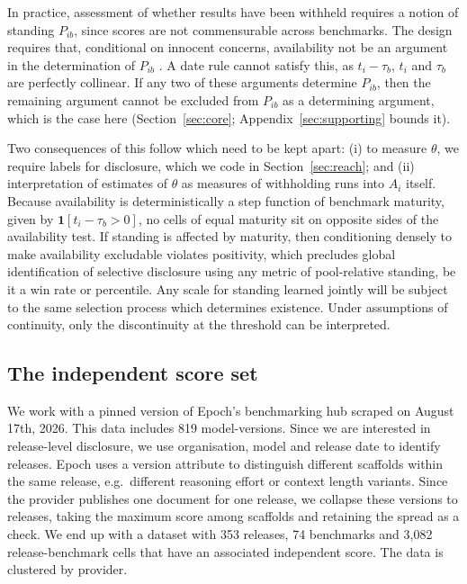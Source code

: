 \documentclass{article}
\begin{document}
In practice, assessment of whether results have been withheld requires a notion of standing $P_{ib}$, since scores are not commensurable across benchmarks. The design requires that, conditional on innocent concerns, availability not be an argument in the determination of $P_{ib}$ \citep{heckman1979}. A date rule cannot satisfy this, as $t_i - \tau_b$, $t_i$ and $\tau_b$ are perfectly collinear. If any two of these arguments determine $P_{ib}$, then the remaining argument cannot be excluded from $P_{ib}$ as a determining argument, which is the case here (Section~\ref{sec:core}; Appendix~\ref{sec:supporting} bounds it).

Two consequences of this follow which need to be kept apart: (i) to measure $\theta$, we require labels for disclosure, which we code in Section~\ref{sec:reach}; and (ii) interpretation of estimates of $\theta$ as measures of withholding runs into $A_i$ itself. Because availability is deterministically a step function of benchmark maturity, given by $\mathbf{1}[t_i - \tau_b > 0]$, no cells of equal maturity sit on opposite sides of the availability test. If standing is affected by maturity, then conditioning densely to make availability excludable violates positivity, which precludes global identification of selective disclosure using any metric of pool-relative standing, be it a win rate or percentile. Any scale for standing learned jointly will be subject to the same selection process which determines existence. Under assumptions of continuity, only the discontinuity at the threshold can be interpreted.

\subsection{The independent score set}\label{sec:data-scores}

We work with a pinned version of Epoch's benchmarking hub scraped on August 17th, 2026. This data includes 819 model-versions. Since we are interested in release-level disclosure, we use organisation, model and release date to identify releases. Epoch uses a version attribute to distinguish different scaffolds within the same release, e.g.\ different reasoning effort or context length variants. Since the provider publishes one document for one release, we collapse these versions to releases, taking the maximum score among scaffolds and retaining the spread as a check. We end up with a dataset with 353 releases, 74 benchmarks and 3,082 release-benchmark cells that have an associated independent score. The data is clustered by provider.
\end{document}
